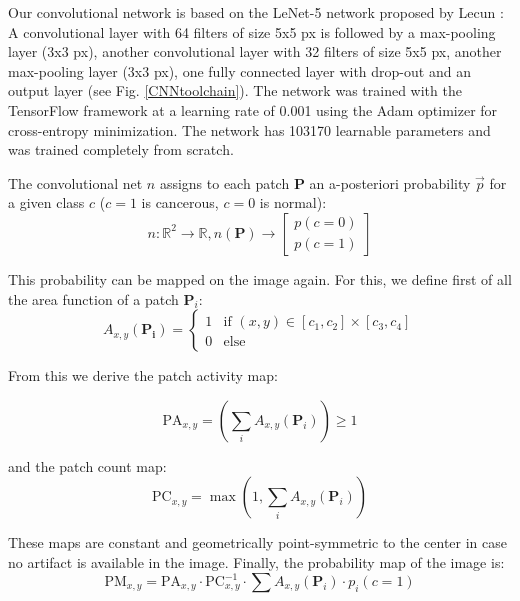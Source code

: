 \documentclass[fleqn,10pt]{wlscirep}
\begin{document}
Our convolutional network is based on the LeNet-5 network proposed by Lecun
\cite{LeCun:1998fv}: A convolutional layer with 64 filters of size 5x5 px is followed
by a max-pooling layer (3x3 px), another convolutional layer with 32
filters of size 5x5 px, another max-pooling layer (3x3 px), one fully connected layer with drop-out and an output
layer (see Fig. \ref{CNNtoolchain}). The network was trained with
the TensorFlow framework \cite{Abadi:2016vn} at a
learning rate of 0.001 using the Adam optimizer \cite{Kingma:2014us} for cross-entropy minimization. The network has 103170 learnable parameters and was trained completely from scratch.

The convolutional net $n$ assigns to each patch $\textbf{P}$ an a-posteriori probability $\vec{p}$ for a given class $c$ ($c=1$ is cancerous, $c=0$ is normal):
\begin{equation}
n: \mathbb{R}^2 \rightarrow \mathbb{R}, n(\textbf{P}) \rightarrow
\left[ \begin{matrix}p({c=0}) \\ p({c=1}) \end{matrix} \right]
\end{equation}

This probability can be mapped on the image again. For this, we define
first of all the area function of a patch $\textbf{P}_i$:
\begin{equation}
A_{x, y}(\mathbf{P_i}) = \begin{cases}1 & \text{if } (x, y) \in [c_{1}, c_{2}] \times [c_{3}, c_{4}]  \\
0 & \text{else}
\end{cases}
\end{equation}

From this we derive the patch activity map:

\begin{equation}
\mathrm{PA}_{x,y} = \left( \sum_i A _{x,y} (\textbf{P}_i) \right) \geq 1
\end{equation}

and the patch count map:
\begin{equation}
\mathrm{PC}_{x,y} = \max \left( 1, \sum_i A _{x,y} ( \textbf{P}_i ) \right)
\end{equation}

These maps are constant and geometrically point-symmetric to the
center in case no artifact is available in the image. Finally, the probability map of the image is:
\begin{equation}
\mathrm{PM}_{x,y} = \mathrm{PA}_{x,y} \cdot \mathrm{PC}_{x,y}^{-1} \cdot\sum{ A_{x,y}(\textbf{P}_i) \cdot p_i(c=1)} 
\end{equation}
\end{document}
